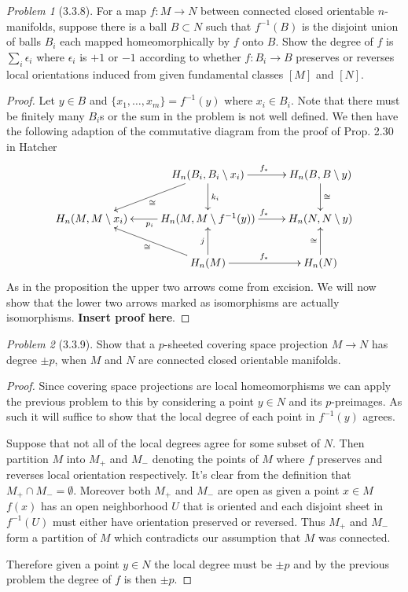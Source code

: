 \documentclass[10pt]{article}
\newcommand{\sk}{\vskip 10mm}
\theoremstyle{remark}
\newtheorem{problem}{Problem}
\begin{document}
\begin{problem}[3.3.8]
  For a map $f:M\rightarrow N$ between connected closed orientable
  $n$-manifolds, suppose there is a ball $B\subset N$ such that $f^{-1}(B)$ is
  the disjoint union of balls $B_i$ each mapped homeomorphically by $f$ onto
  $B$. Show the degree of $f$ is $\sum_i\epsilon_i$ where $\epsilon_i$ is
  $+1$ or $-1$ according to whether $f:B_i\rightarrow B$ preserves or reverses
  local orientations induced from given fundamental classes $[M]$ and $[N]$.
\end{problem}

\begin{proof}
  Let $y\in B$ and $\{x_1,\ldots,x_m\}=f^{-1}(y)$ where $x_i\in B_i$. Note that there must
  be finitely many $B_i$s or the sum in the problem is not well defined. We then
  have the following adaption of the commutative diagram from the proof of Prop. 2.30 in Hatcher
  \[
    \xymatrix{
      & H_n(B_i,B_i\setminus x_i) \ar[r]^{f_*} \ar[dl]^\cong \ar[d]^{k_i}& H_n(B,B\setminus y) \ar[d]^{\cong}\\
      H_n(M,M\setminus x_i) & H_n(M,M\setminus f^{-1}(y)) \ar[l]^{p_i} \ar[r]^{f_*} & H_n(N,N\setminus y)\\
      & H_n(M) \ar[ul]^{\cong} \ar[u]^j \ar[r]^{f_*} & H_n(N) \ar[u]^\cong \\
    }
  \]
  As in the proposition the upper two arrows come from excision. We will now
  show that the lower two arrows marked as isomorphisms are actually isomorphisms.
  \textbf{Insert proof here}.
\end{proof}

\sk

\begin{problem}[3.3.9]
  Show that a $p$-sheeted covering space projection $M\rightarrow N$ has
  degree $\pm p$, when $M$ and $N$ are connected closed orientable manifolds.
\end{problem}

\begin{proof}
  Since covering space projections are local homeomorphisms we can apply the previous
  problem to this by considering a point $y\in N$ and its $p$-preimages. As such
  it will suffice to show that the local degree of each point in $f^{-1}(y)$
  agrees.

  Suppose that not all of the local degrees agree for some subset of $N$. Then
  partition $M$ into $M_+$ and $M_-$ denoting the points of $M$ where $f$ preserves
  and reverses local orientation respectively. It's clear from the definition
  that $M_+\cap M_-=\emptyset$. Moreover both $M_+$ and $M_-$ are open as given a point $x\in M$
  $f(x)$ has an open neighborhood $U$ that is oriented and each disjoint sheet in
  $f^{-1}(U)$ must either have orientation preserved or reversed. Thus $M_+$ and
  $M_-$ form a partition of $M$ which contradicts our assumption that $M$ was
  connected.

  Therefore given a point $y\in N$ the local degree must be $\pm p$ and by the
  previous problem the degree of $f$ is then $\pm p$.
\end{proof}
\end{document}
